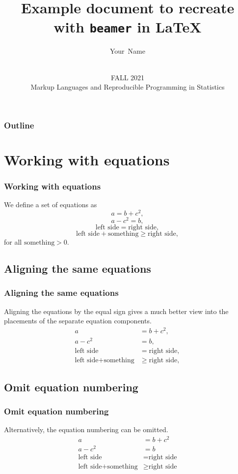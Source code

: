 \documentclass[aspectratio=169]{beamer} %
\title[Example] {Example document to recreate with \texttt{beamer} in \LaTeX}
\author[Your Name]
{
 Your~Name
}
\date[MLRPS]
{\vspace{.5 in}\\ FALL 2021 \\ Markup Languages and Reproducible Programming in Statistics  \vskip6mm}
\begin{document}
\titlepage

\begin{frame}
\frametitle{Outline}
\tableofcontents
\end{frame}

\section{Working with equations}
\begin{frame}
\frametitle{Working with equations}
    We define a set of equations as
    \begin{equation}
        a=b+c^2,
    \end{equation}
    \begin{equation}
    	a-c^2=b,
    \end{equation}
    \begin{equation}
    	\text{left side} = \text{right side},
    \end{equation}
    \begin{equation}
    	\text{left side} + \text{something} \geq \text{right side},
    \end{equation}
    for all $\text{something} > 0$. 
\end{frame}

\subsection{Aligning the same equations}
\begin{frame}
\frametitle{Aligning the same equations}
    Aligning the equations by the equal sign gives a much better view into the placements of the separate equation components. 
    \begin{align}
    	a&=b+c^2,\\
    	a-c^2&=b,\\
    	\text{left side} &= \text{right side},\\
    	\text{left side} + \text{something} & \geq \text{right side},
    \end{align}
\end{frame}

\subsection{Omit equation numbering}
\begin{frame}
\frametitle{Omit equation numbering}
    Alternatively, the equation numbering can be omitted. 
    \begin{align*}
    	a&=b+c^2\\
    	a-c^2&=b\\
    	\text{left side} &= \text{right side}\\
    	\text{left side} + \text{something} & \geq \text{right side}
    \end{align*}
\end{frame}
\end{document}
